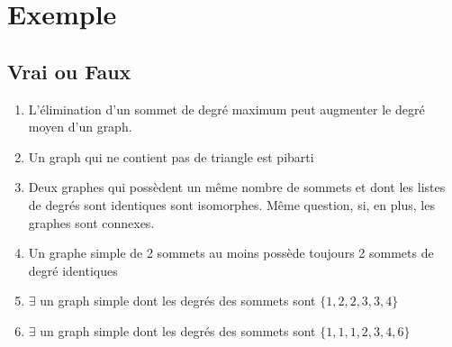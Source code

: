 \section{Exemple}

\subsection{Vrai ou Faux}
\begin{enumerate}
	\item{L'élimination d'un sommet de degré maximum peut augmenter le degré moyen d'un graph.}
	\item{Un graph qui ne contient pas de triangle est pibarti}
	\item{Deux graphes qui possèdent un même nombre de sommets et dont les listes de degrés sont identiques sont isomorphes. Même question, si, en plus, les graphes sont connexes.}
	\item{Un graphe simple de 2 sommets au moins possède toujours 2 sommets de degré identiques}
	\item{$\exists$ un graph simple dont les degrés des sommets sont $\{1,2,2,3,3,4\}$}
	\item{$\exists$ un graph simple dont les degrés des sommets sont $\{1,1,1,2,3,4,6\}$}
\end{enumerate}

